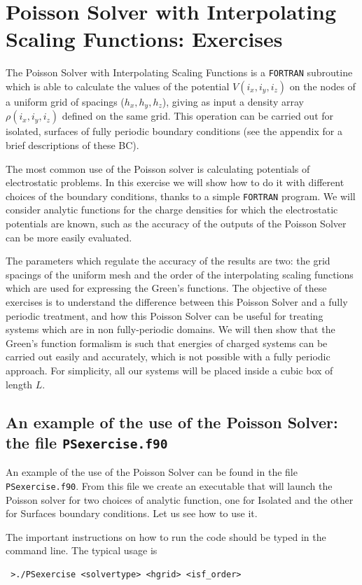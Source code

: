 \documentclass[a4paper]{article}
\begin{document}
\section*{Poisson Solver with Interpolating Scaling Functions: Exercises}
The Poisson Solver with Interpolating Scaling Functions is a \texttt{FORTRAN} subroutine which is able to calculate the values of the potential $V(i_x,i_y,i_z)$ on the nodes of a uniform grid of spacings ($h_x,h_y,h_z$), giving as input a density array $\rho(i_x,i_y,i_z)$ defined on the same grid. This operation can be carried out for isolated, surfaces of fully periodic boundary conditions (see the appendix for a brief descriptions of these BC).

The most common use of the Poisson solver is calculating potentials of electrostatic problems. In this exercise we will show how to do it with different choices of the boundary conditions, thanks to a simple \texttt{FORTRAN} program.
We will consider analytic functions for the charge densities for which the electrostatic potentials are known, such as the accuracy of the outputs of the Poisson Solver can be more easily evaluated.

The parameters which regulate the accuracy of the results are two: the grid spacings of the uniform mesh and the order of the interpolating scaling functions which are used for expressing the Green's functions. The objective of these exercises is to understand the difference between this Poisson Solver and a fully periodic treatment, and how this Poisson Solver can be useful for treating systems which are in non fully-periodic domains.
We will then show that the Green's function formalism is such that energies of charged systems can be carried out easily and accurately, which is not possible with a fully periodic approach.
For simplicity, all our systems will be placed inside a cubic box of length $L$.

\subsection*{An example of the use of the Poisson Solver: the file \texttt{PSexercise.f90}}
An example of the use of the Poisson Solver can be found in the file \texttt{PSexercise.f90}.
From this file we create an executable that will launch the Poisson solver for two choices of analytic function, one for Isolated and the other for Surfaces boundary conditions.
Let us see how to use it.

The important instructions on how to run the code should be typed in the command line.
The typical usage is
\begin{verbatim}
 >./PSexercise <solvertype> <hgrid> <isf_order>
\end{verbatim}
\end{document}
